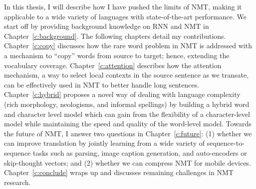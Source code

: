 In this thesis, I will describe how I have pushed the limits of NMT, making it
applicable to a wide variety of languages with state-of-the-art performance.
We start off by providing background knowledge on RNN and NMT
in Chapter~\ref{c:background}. The following chapters detail my contributions.
Chapter~\ref{c:copy} discusses how the rare word
problem in NMT is addressed with a mechanism to ``copy'' words from source to
target; hence, extending the vocabulary
coverage. Chapter~\ref{c:attention} describes
how the attention mechanism, a way to select
local contexts in the source sentence as we transate, can be effectively used in
NMT to better handle long sentences. Chapter~\ref{c:hybrid} 
proposes a novel way of dealing with language complexity (rich morphology,
neologisms, and informal spellings) by building a hybrid word and character
level model which can gain from the flexibility of a character-level model while
maintaining the speed and quality of the word-level model. Towards the future of
NMT, I answer two questions in Chapter~\ref{c:future}: (1) whether we can improve translation by jointly
learning from a wide variety of sequence-to-sequence tasks such as parsing,
image caption generation, and auto-encoders or skip-thought vectors; and (2)
whether we can compress NMT for mobile devices.
Chapter~\ref{c:conclude} wraps up and discusses remaining challenges in NMT
research.
